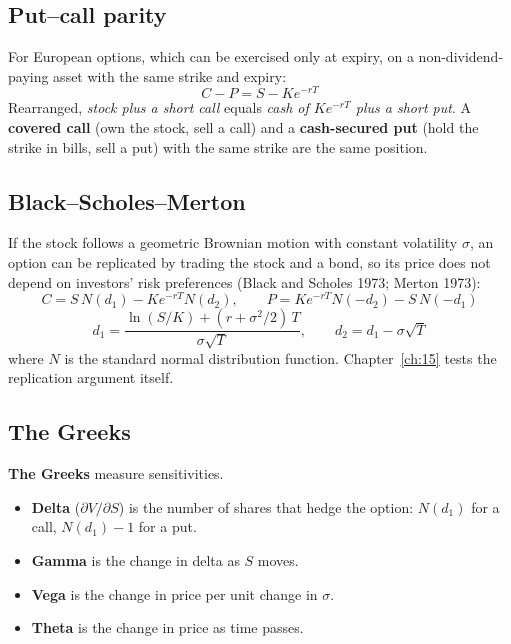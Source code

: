 \subsection{Put--call parity}

For European options, which can be exercised only at expiry, on a non-dividend-paying asset with the same strike and expiry:
\begin{equation}
  C - P = S - K e^{-rT}
  \label{eq:14-parity}
\end{equation}
Rearranged, \emph{stock plus a short call} equals \emph{cash of $Ke^{-rT}$ plus a short put}. A \textbf{covered call} (own the stock, sell a call) and a \textbf{cash-secured put} (hold the strike in bills, sell a put) with the same strike are the same position.

\subsection{Black--Scholes--Merton}
\label{sec:14-bsm}

If the stock follows a geometric Brownian motion with constant volatility $\sigma$, an option can be replicated by trading the stock and a bond, so its price does not depend on investors' risk preferences (Black and Scholes 1973; Merton 1973):
\begin{equation}
  C = S\,N(d_1) - K e^{-rT} N(d_2), \qquad P = K e^{-rT} N(-d_2) - S\,N(-d_1)
  \label{eq:14-bs}
\end{equation}
\begin{equation}
  d_1 = \frac{\ln(S/K) + (r + \sigma^2/2)\,T}{\sigma\sqrt{T}}, \qquad d_2 = d_1 - \sigma\sqrt{T}
  \label{eq:14-d}
\end{equation}
where $N$ is the standard normal distribution function. Chapter~\ref{ch:15} tests the replication argument itself.

\subsection{The Greeks}
\label{sec:14-greeks}

\textbf{The Greeks} measure sensitivities.

\begin{itemize}
  \item \textbf{Delta} ($\partial V/\partial S$) is the number of shares that hedge the option: $N(d_1)$ for a call, $N(d_1) - 1$ for a put.
  \item \textbf{Gamma} is the change in delta as $S$ moves.
  \item \textbf{Vega} is the change in price per unit change in $\sigma$.
  \item \textbf{Theta} is the change in price as time passes.
\end{itemize}

